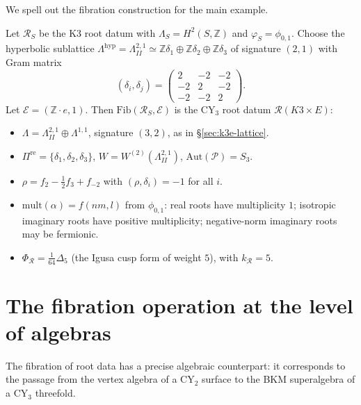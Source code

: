 We spell out the fibration construction for the main example.

\begin{example}
\label{ex:k3-e-fibration}
Let $\mathcal{R}_S$ be the K3 root datum with $\Lambda_S = H^2(S, \mathbb{Z})$ and $\varphi_S = \phi_{0,1}$. Choose the hyperbolic sublattice $\Lambda^{\mathrm{hyp}} = \Lambda^{2,1}_{II} \simeq \mathbb{Z}\delta_1 \oplus \mathbb{Z}\delta_2 \oplus \mathbb{Z}\delta_3$ of signature $(2,1)$ with Gram matrix
\[
 (\delta_i, \delta_j) = \begin{pmatrix} 2 & -2 & -2 \\ -2 & 2 & -2 \\ -2 & -2 & 2 \end{pmatrix}.
\]
Let $\mathcal{E} = (\mathbb{Z} \cdot e, 1)$. Then $\mathrm{Fib}(\mathcal{R}_S, \mathcal{E})$ is the CY$_3$ root datum $\mathcal{R}(K3 \times E)$:
\begin{itemize}
 \item $\Lambda = \Lambda^{2,1}_{II} \oplus \Lambda^{1,1}$, signature $(3,2)$, as in \S\ref{sec:k3e-lattice}.
 \item $\Pi^{\mathrm{re}} = \{\delta_1, \delta_2, \delta_3\}$, $W = W^{(2)}(\Lambda^{2,1}_{II})$, $\mathrm{Aut}(\mathcal{P}) = S_3$.
 \item $\rho = f_2 - \frac{1}{2}f_3 + f_{-2}$ with $(\rho, \delta_i) = -1$ for all $i$.
 \item $\mathrm{mult}(\alpha) = f(nm, l)$ from $\phi_{0,1}$: real roots have multiplicity $1$; isotropic imaginary roots have positive multiplicity; negative-norm imaginary roots may be fermionic.
 \item $\Phi_{\mathcal{R}} = \frac{1}{64}\Delta_5$ (the Igusa cusp form of weight $5$), with $k_\mathcal{R} = 5$.
\end{itemize}
\end{example}


\section{The fibration operation at the level of algebras}
\label{sec:fibration-algebras}

The fibration of root data has a precise algebraic counterpart: it corresponds to the passage from the vertex algebra of a CY$_2$ surface to the BKM superalgebra of a CY$_3$ threefold.

